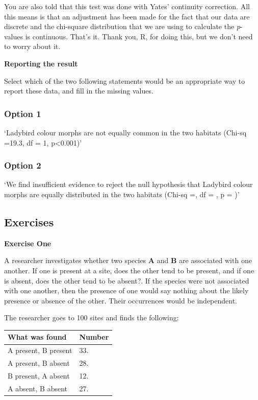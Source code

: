 \documentclass[
  letterpaper,
  DIV=11,
  numbers=noendperiod]{scrreprt}
\begin{document}
You are also told that this test was done with Yates' continuity
correction. All this means is that an adjustment has been made for the
fact that our data are discrete and the chi-square distribution that we
are using to calculate the \emph{p}-values is continuous. That's it.
Thank you, R, for doing this, but we don't need to worry about it.

\textbf{Reporting the result}

Select which of the two following statements would be an appropriate way
to report these data, and fill in the missing values.

\subsubsection{Option 1}\label{option-1}

`Ladybird colour morphs are not equally common in the two habitats
(Chi-sq =19.3, df = 1, p\textless0.001)'

\subsubsection{Option 2}\label{option-2}

`We find insufficient evidence to reject the null hypothesis that
Ladybird colour morphs are equally distributed in the two habitats
(Chi-sq =, df = , p = )'

\subsection{Exercises}\label{exercises-1}

\textbf{Exercise One}

A researcher investigates whether two species \textbf{A} and \textbf{B}
are associated with one another. If one is present at a site, does the
other tend to be present, and if one is absent, does the other tend to
be absent?. If the species were not associated with one another, then
the presence of one would say nothing about the likely presence or
absence of the other. Their occurrences would be independent.

The researcher goes to 100 sites and finds the following:

\begin{longtable}[]{@{}ll@{}}
\toprule\noalign{}
What was found & Number \\
\midrule\noalign{}
\endhead
\bottomrule\noalign{}
\endlastfoot
A present, B present & 33. \\
A present, B absent & 28. \\
B present, A absent & 12. \\
A absent, B absent & 27. \\
\end{longtable}
\end{document}
